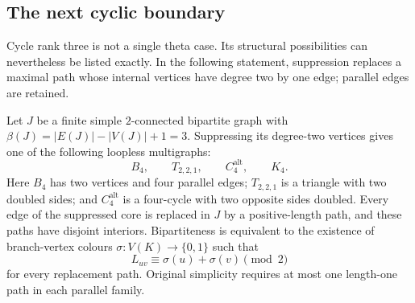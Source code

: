 
\subsection{The next cyclic boundary}

Cycle rank three is not a single theta case.  Its structural possibilities
can nevertheless be listed exactly.  In the following statement,
suppression replaces a maximal path whose internal vertices have degree
two by one edge; parallel edges are retained.

\begin{proposition}
\label{density-rank-three-core-list}
Let $J$ be a finite simple $2$-connected bipartite graph with
$\beta(J)=|E(J)|-|V(J)|+1=3$.  Suppressing its degree-two vertices gives
one of the following loopless multigraphs:
\[
 B_4,\qquad T_{2,2,1},\qquad C_4^{\mathrm{alt}},\qquad K_4.
\]
Here $B_4$ has two vertices and four parallel edges;
$T_{2,2,1}$ is a triangle with two doubled sides;
and $C_4^{\mathrm{alt}}$ is a four-cycle with two opposite sides doubled.
Every edge of the suppressed core is replaced in $J$ by a positive-length
path, and these paths have disjoint interiors.  Bipartiteness is equivalent
to the existence of branch-vertex colours $\sigma:V(K)\to\{0,1\}$ such that
\[
 L_{uv}\equiv\sigma(u)+\sigma(v)\pmod2
\]
for every replacement path.  Original simplicity requires at most one
length-one path in each parallel family.
\end{proposition}
